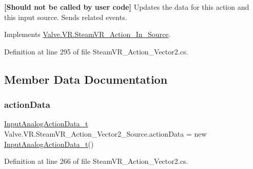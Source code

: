 {\bfseries{\mbox{[}Should not be called by user code\mbox{]}}} Updates the data for this action and this input source. Sends related events. 



Implements \mbox{\hyperlink{class_valve_1_1_v_r_1_1_steam_v_r___action___in___source_a800b521715c6cbfe32e9b0b6db7e0a16}{Valve.\+V\+R.\+Steam\+V\+R\+\_\+\+Action\+\_\+\+In\+\_\+\+Source}}.



Definition at line 295 of file Steam\+V\+R\+\_\+\+Action\+\_\+\+Vector2.\+cs.



\subsection{Member Data Documentation}
\mbox{\label{class_valve_1_1_v_r_1_1_steam_v_r___action___vector2___source_a83a369d6d658bbf4a5c13e65405ed929}} 
\subsubsection{\texorpdfstring{actionData}{actionData}}
{\footnotesize\ttfamily \mbox{\hyperlink{struct_valve_1_1_v_r_1_1_input_analog_action_data__t}{Input\+Analog\+Action\+Data\+\_\+t}} Valve.\+V\+R.\+Steam\+V\+R\+\_\+\+Action\+\_\+\+Vector2\+\_\+\+Source.\+action\+Data = new \mbox{\hyperlink{struct_valve_1_1_v_r_1_1_input_analog_action_data__t}{Input\+Analog\+Action\+Data\+\_\+t}}()\hspace{0.3cm}{\ttfamily [protected]}}



Definition at line 266 of file Steam\+V\+R\+\_\+\+Action\+\_\+\+Vector2.\+cs.

\mbox{\label{class_valve_1_1_v_r_1_1_steam_v_r___action___vector2___source_ae212df15f42bee205429f9e0eb40cfc8}} 

